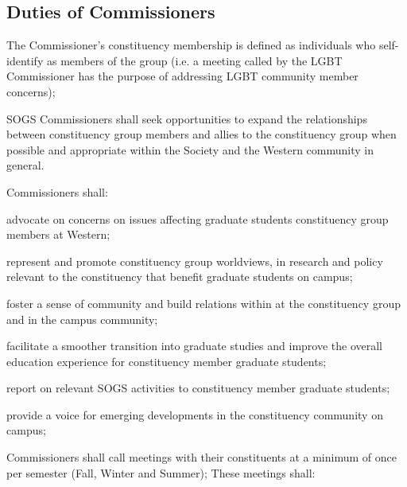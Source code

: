 \subsection{Duties of Commissioners}
\begin{longenum}[ label*=\thesubsection.\arabic*., align=left]
\item The Commissioner's constituency membership is defined as individuals who self-identify as members of the group (i.e. a meeting called by the LGBT Commissioner has the purpose of addressing LGBT community member concerns);

\item SOGS Commissioners shall seek opportunities to expand the relationships between constituency group members and allies to the constituency group when possible and appropriate within the Society and the Western community in general.
\item Commissioners shall:
\begin{longenum}[ label*=\arabic*., align=left]
\item  advocate on concerns on issues affecting graduate students constituency group members at Western;
\item  represent and promote constituency group worldviews, in research and policy relevant to the constituency that benefit graduate students on campus;

\item  foster a sense of community and build relations within at the constituency group and in the campus community;
\item  facilitate a smoother transition into graduate studies and improve the overall education experience for constituency member graduate students;
\item report on relevant SOGS activities to constituency member graduate students;
\item  provide a voice for emerging developments in the constituency community on campus;
\end{longenum}
\item Commissioners shall call meetings with their constituents at a minimum of once per semester (Fall, Winter and Summer);\newline
These meetings shall:
\begin{longenum}[ label*=\arabic*., align=left]



\end{longenum}
\end{longenum}
